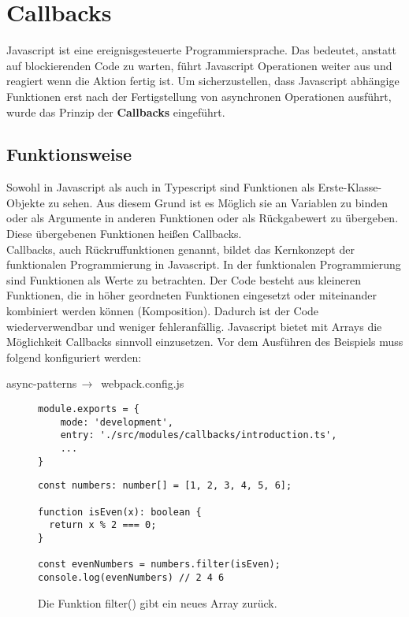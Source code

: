 \section{Callbacks}
Javascript ist eine ereignisgesteuerte Programmiersprache. Das bedeutet, anstatt auf blockierenden Code zu warten, führt Javascript Operationen weiter aus und reagiert wenn die Aktion fertig ist. Um sicherzustellen, dass Javascript abhängige Funktionen erst nach der Fertigstellung von asynchronen Operationen ausführt, wurde das Prinzip der \textbf{Callbacks} eingeführt.

\subsection{Funktionsweise}

Sowohl in Javascript als auch in Typescript sind Funktionen als Erste-Klasse-Objekte zu sehen. Aus diesem Grund ist es Möglich sie an Variablen zu binden oder als Argumente in anderen Funktionen oder als Rückgabewert zu übergeben. Diese übergebenen Funktionen heißen Callbacks.\\

\noindent
Callbacks, auch Rückruffunktionen genannt, bildet das Kernkonzept der funktionalen Programmierung in Javascript.\cite{callbacks-intro} In der funktionalen Programmierung sind Funktionen als Werte zu betrachten. Der Code besteht aus kleineren Funktionen, die in höher geordneten Funktionen eingesetzt oder miteinander kombiniert werden können (Komposition). Dadurch ist der Code wiederverwendbar und weniger fehleranfällig. Javascript bietet mit Arrays die Möglichkeit Callbacks sinnvoll einzusetzen. Vor dem Ausführen des Beispiels muss folgend konfiguriert werden:

\begin{center}
    async-patterns$\,\to\,$ webpack.config.js
\end{center}

\begin{figure}[H]
\begin{lstlisting}[basicstyle=\small]
module.exports = {
    mode: 'development',
    entry: './src/modules/callbacks/introduction.ts',
    ...
}
\end{lstlisting}
\end{figure}

\begin{figure}[H]
\begin{lstlisting}[basicstyle=\small]
const numbers: number[] = [1, 2, 3, 4, 5, 6];

function isEven(x): boolean { 
  return x % 2 === 0; 
}

const evenNumbers = numbers.filter(isEven);
console.log(evenNumbers) // 2 4 6
\end{lstlisting}
\caption{Die Funktion filter() gibt ein neues Array zurück.}
\end{figure}

